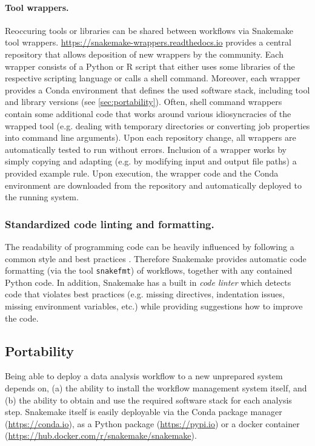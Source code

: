 \documentclass[parskip=half]{scrartcl}
\let\plainurl\url
\renewcommand{\url}[1]{\protect\plainurl{#1}}
\begin{document}
\paragraph{Tool wrappers.}
Reoccuring tools or libraries can be shared between workflows via Snakemake tool wrappers.
\url{https://snakemake-wrappers.readthedocs.io} provides a central repository that allows deposition of new wrappers by the community.
Each wrapper consists of a Python or R script that either uses some libraries of the respective scripting language or calls a shell command.
Moreover, each wrapper provides a Conda environment that defines the used software stack, including tool and library versions (see \autoref{sec:portability}).
Often, shell command wrappers contain some additional code that works around various idiosyncracies of the wrapped tool (e.g. dealing with temporary directories or converting job properties into command line arguments).
Upon each repository change, all wrappers are automatically tested to run without errors.
Inclusion of a wrapper works by simply copying and adapting (e.g. by modifying input and output file paths) a provided example rule.
Upon execution, the wrapper code and the Conda environment are downloaded from the repository and automatically deployed to the running system.

\subsubsection{Standardized code linting and formatting.}

The readability of programming code can be heavily influenced by following a common style and best practices \parencite{tysell_sundkvist_code_2017}.
Therefore Snakemake provides automatic code formatting (via the tool \lstinline!snakefmt!) of workflows, together with any contained Python code.
In addition, Snakemake has a built in \emph{code linter} which detects code that violates best practices (e.g. missing directives, indentation issues, missing environment variables, etc.) while providing suggestions how to improve the code.

\subsection{Portability}\label{sec:portability}

Being able to deploy a data analysis workflow to a new unprepared system depends on, (a) the ability to install the workflow management system itself, and (b) the ability to obtain and use the required software stack for each analysis step.
Snakemake itself is easily deployable via the Conda package manager (\url{https://conda.io}), as a Python package (\url{https://pypi.io}) or a docker container (\url{https://hub.docker.com/r/snakemake/snakemake}).
\end{document}
